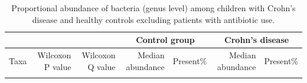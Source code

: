 \newpage
{\footnotesize
	\renewcommand{\arraystretch}{0.7} \setlength{\tabcolsep}{3pt}
	\begin{longtable}{ | l | r | r | r | r | r | r  | }
		\caption[Proportional abundance of bacteria (genus level) among children with Crohn's disease and healthy controls excluding patients with antibiotic use]{Proportional abundance of bacteria (genus level) among children with Crohn's disease and healthy controls excluding patients with antibiotic use.} 
		\label{TS6} \\
		
		\hline
		\multicolumn{3}{|c|}{} & \multicolumn{2}{c}{Control group}
		& \multicolumn{2}{|c|}{Crohn's disease}\\
		\hline 
		Taxa & Wilcoxon P value & Wilcoxon Q value & Median abundance & Present\% & Median abundance & Present\% \\ 
		\hline 
		\endfirsthead
		
		
		\endfoot
		
		\hline 
		\endlastfoot
		
		
		

\end{longtable}}
